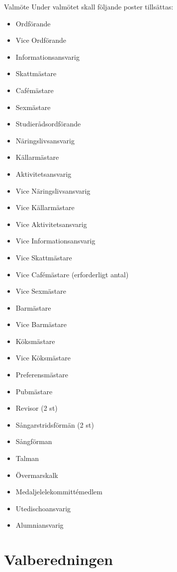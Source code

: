 \documentclass[pdfbookmarks,a4paper,11pt]{article}
\newlength{\itemcollength}
\newenvironment{reglemlista}{%
  \begin{list}{}{%
      \setlength{\labelwidth}{\itemcollength}%
      \setlength{\leftmargin}{\labelwidth + \labelsep}%
      \renewcommand{\makelabel}[1]{%
        \raisebox{0pt}[1ex][0pt]{%
          \makebox[\labelwidth][l]{%
            \parbox[t]{\itemcollength}{%
              \raggedright\hspace{0pt}##1}}}\hfill}%
      }}{%
  \end{list}}
\begin{document}
\begin{reglemlista}
	\item[Valmöte]
	Under valmötet skall följande poster tillsättas:
	\begin{itemize}
		\item Ordförande
		\item Vice Ordförande
		\item Informationsansvarig
		\item Skattmästare
		\item Cafémästare
		\item Sexmästare
		\item Studierådsordförande
		\item Näringslivsansvarig
		\item Källarmästare
		\item Aktivitetsansvarig
		\item Vice Näringslivsansvarig
		\item Vice Källarmästare
		\item Vice Aktivitetsansvarig
		\item Vice Informationsansvarig
		\item Vice Skattmästare
		\item Vice Cafémästare (erforderligt antal)
		\item Vice Sexmästare
		\item Barmästare
		\item Vice Barmästare
		\item Köksmästare
		\item Vice Köksmästare
		\item Preferensmästare
		\item Pubmästare
		\item Revisor (2 st)
		\item Sångarstridsförmän (2 st)
		\item Sångförman
		\item Talman
		\item Övermarskalk
		\item Medaljelelekommittémedlem
		\item Utedischoansvarig
		\item Alumniansvarig
	\end{itemize}

\end{reglemlista}

\section{Valberedningen}
\end{document}
